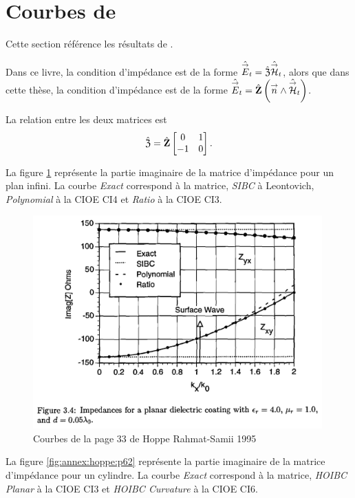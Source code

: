\section[Courbes de HOPPE 1995]{Courbes de \cite{hoppe_impedance_1995}}
\label{sec:annexe:hoppe}
Cette section référence les résultats de \cite{hoppe_impedance_1995}. 


Dans ce livre, la condition d'impédance est de la forme \(\hat{{\overset{\rightarrow}{E}}}_t = \hat{\mathfrak{Z}} \hat{{\overset{\rightarrow}{\mathcal{H}}}}_t\), alors que dans cette thèse, la condition d'impédance est de la forme \(\hat{{\overset{\rightarrow}{E}}}_t = \hat{\mathbf{Z}} \left({\overset{\rightarrow}{n}} \wedge \hat{{\overset{\rightarrow}{\mathcal{H}}}}_t\right)\). 

La relation entre les deux matrices est
\begin{equation}
  \hat{\mathfrak{Z}} = \hat{\mathbf{Z}}\begin{bmatrix}0&1\\-1&0\end{bmatrix}.
\end{equation}

La figure \ref{fig:annex:hoppe:p33} représente la partie imaginaire de la matrice d'impédance pour un plan infini. La courbe \textit{Exact} correspond à la matrice, \textit{SIBC} à Leontovich, \textit{Polynomial} à la CIOE CI4 et \textit{Ratio} à la CIOE CI3.

\begin{figure}[h!tb]
    \includegraphics[width=0.99\textwidth]{images/hoppe/p33_imp_cylindre.png}
    \caption{Courbes de la page 33 de Hoppe Rahmat-Samii 1995}
    \label{fig:annex:hoppe:p33}
\end{figure}

La figure \ref{fig:annex:hoppe:p62} représente la partie imaginaire de la matrice d'impédance  pour un cylindre. La courbe \textit{Exact} correspond à la matrice, \textit{HOIBC Planar} à la CIOE CI3 et \textit{HOIBC Curvature} à la CIOE CI6.

